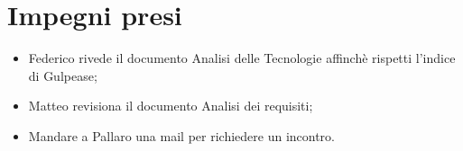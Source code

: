 \documentclass[a4paper, 12pt]{article}
\begin{document}
\section{Impegni presi}
\begin{itemize}
    \item Federico rivede il documento Analisi delle Tecnologie affinchè rispetti l'indice di Gulpease;
	\item Matteo revisiona il documento Analisi dei requisiti;
    \item Mandare a Pallaro una mail per richiedere un incontro.
\end{itemize}
\end{document}
